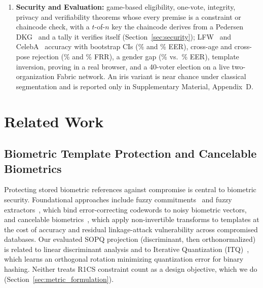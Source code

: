 \documentclass[10pt,letterpaper,journal]{IEEEtran}
\begin{document}
\begin{enumerate}[leftmargin=*,noitemsep,topsep=1pt,parsep=0pt]
    \item \textbf{Security and Evaluation:} game-based eligibility, one-vote, integrity, privacy and verifiability theorems whose every premise is a constraint or chaincode check, with a $t$-of-$n$ key the chaincode derives from a Pedersen DKG~\cite{Pedersen1991} and a tally it verifies itself (Section~\ref{sec:security}); LFW~\cite{Huang2007LFW} and CelebA~\cite{Liu2015CelebA} accuracy with bootstrap CIs (\nLfwEer\% and \nCelebaEer\% EER), cross-age and cross-pose rejection (\nCalfwFrr\% and \nCplfwFrr\% FRR), a gender gap (\nMaleEer\% vs.\ \nFemaleEer\% EER), template inversion, proving in a real browser, and a 40-voter election on a live two-organization Fabric network. An iris variant is near chance under classical segmentation and is reported only in Supplementary Material, Appendix~D.
\end{enumerate}

\section{Related Work}
\label{sec:related}


\subsection{Biometric Template Protection and Cancelable Biometrics}
\label{subsec:rel_biometric}
Protecting stored biometric references against compromise is central to biometric security. Foundational approaches include fuzzy commitments~\cite{JuelsWattenberg1999} and fuzzy extractors~\cite{Dodis2004}, which bind error-correcting codewords to noisy biometric vectors, and cancelable biometrics~\cite{Rathgeb2011}, which apply non-invertible transforms to templates at the cost of accuracy and residual linkage-attack vulnerability across compromised databases.
Our evaluated SOPQ projection (discriminant, then orthonormalized) is related to linear discriminant analysis and to Iterative Quantization (ITQ)~\cite{Gong2013}, which learns an orthogonal rotation minimizing quantization error for binary hashing. Neither treats R1CS constraint count as a design objective, which we do (Section~\ref{sec:metric_formulation}).
\end{document}
